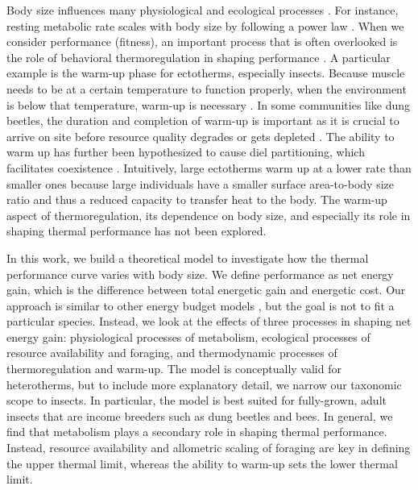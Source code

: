 Body size influences many physiological and ecological processes \citep{Peters1986}.
For instance, resting metabolic rate scales with body size by following a power law \citep{Kleiber1947, Peters1986, Gillooly2001,Brown2004}.
When we consider performance (fitness), an important process that is often overlooked is the role of behavioral thermoregulation in shaping performance \citep{Kearney2009b}.
A particular example is the warm-up phase for ectotherms, especially insects.
Because muscle needs to be at a certain temperature to function properly, when the environment is below that temperature, warm-up is necessary \citep[e.g.,][]{Heinrich1975}.
In some communities like dung beetles, the duration and completion of warm-up is important as it is crucial to arrive on site before resource quality degrades or gets depleted \citep{Hanski1991}. %
The ability to warm up has further been hypothesized to cause diel partitioning, which facilitates coexistence \citep{Viljanen2009}.
Intuitively, large ectotherms warm up at a lower rate than smaller ones because large individuals have a smaller surface area-to-body size ratio and thus a reduced capacity to transfer heat to the body.
The warm-up aspect of thermoregulation, its dependence on body size, and especially its role in shaping thermal performance has not been explored.

In this work, we build a theoretical model to investigate how the thermal performance curve varies with body size.
We define performance as net energy gain, which is the difference between total energetic gain and energetic cost.
Our approach is similar to other energy budget models \citep[e.g.,][]{Kooijman2009}, but the goal is not to fit a particular species.
Instead, we look at the effects of three processes in shaping net energy gain: physiological processes of metabolism, ecological processes of resource availability and foraging, and thermodynamic processes of thermoregulation and warm-up.  %
The model is conceptually valid for heterotherms, but to include more explanatory detail, we narrow our taxonomic scope to insects.
In particular, the model is best suited for fully-grown, adult insects that are income breeders such as dung beetles and bees.
In general, we find that metabolism plays a secondary role in shaping thermal performance.
Instead, resource availability and allometric scaling of foraging are key in defining the upper thermal limit, whereas the ability to warm-up sets the lower thermal limit.
